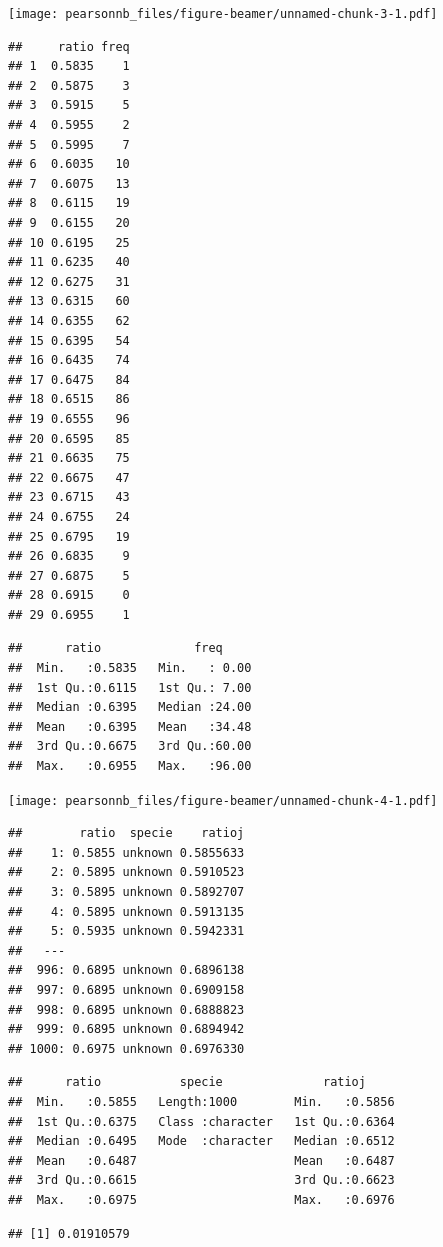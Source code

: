 \documentclass[
  ignorenonframetext,
]{beamer}
\begin{document}
\begin{frame}[fragile]{}
\protect\hypertarget{section-4}{}
\texttt{[image: pearsonnb\_files/figure-beamer/unnamed-chunk-3-1.pdf]}

\begin{verbatim}
##     ratio freq
## 1  0.5835    1
## 2  0.5875    3
## 3  0.5915    5
## 4  0.5955    2
## 5  0.5995    7
## 6  0.6035   10
## 7  0.6075   13
## 8  0.6115   19
## 9  0.6155   20
## 10 0.6195   25
## 11 0.6235   40
## 12 0.6275   31
## 13 0.6315   60
## 14 0.6355   62
## 15 0.6395   54
## 16 0.6435   74
## 17 0.6475   84
## 18 0.6515   86
## 19 0.6555   96
## 20 0.6595   85
## 21 0.6635   75
## 22 0.6675   47
## 23 0.6715   43
## 24 0.6755   24
## 25 0.6795   19
## 26 0.6835    9
## 27 0.6875    5
## 28 0.6915    0
## 29 0.6955    1
\end{verbatim}

\begin{verbatim}
##      ratio             freq      
##  Min.   :0.5835   Min.   : 0.00  
##  1st Qu.:0.6115   1st Qu.: 7.00  
##  Median :0.6395   Median :24.00  
##  Mean   :0.6395   Mean   :34.48  
##  3rd Qu.:0.6675   3rd Qu.:60.00  
##  Max.   :0.6955   Max.   :96.00
\end{verbatim}
\end{frame}

\begin{frame}[fragile]{}
\protect\hypertarget{section-5}{}
\texttt{[image: pearsonnb\_files/figure-beamer/unnamed-chunk-4-1.pdf]}

\begin{verbatim}
##        ratio  specie    ratioj
##    1: 0.5855 unknown 0.5855633
##    2: 0.5895 unknown 0.5910523
##    3: 0.5895 unknown 0.5892707
##    4: 0.5895 unknown 0.5913135
##    5: 0.5935 unknown 0.5942331
##   ---                         
##  996: 0.6895 unknown 0.6896138
##  997: 0.6895 unknown 0.6909158
##  998: 0.6895 unknown 0.6888823
##  999: 0.6895 unknown 0.6894942
## 1000: 0.6975 unknown 0.6976330
\end{verbatim}

\begin{verbatim}
##      ratio           specie              ratioj      
##  Min.   :0.5855   Length:1000        Min.   :0.5856  
##  1st Qu.:0.6375   Class :character   1st Qu.:0.6364  
##  Median :0.6495   Mode  :character   Median :0.6512  
##  Mean   :0.6487                      Mean   :0.6487  
##  3rd Qu.:0.6615                      3rd Qu.:0.6623  
##  Max.   :0.6975                      Max.   :0.6976
\end{verbatim}

\begin{verbatim}
## [1] 0.01910579
\end{verbatim}
\end{frame}
\end{document}
